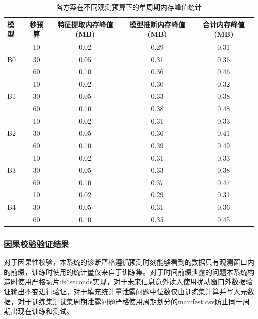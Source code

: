 \documentclass[12pt, a4paper]{ctexart}
\begin{document}
\begin{table}[H]
    \centering
    \caption{各方案在不同观测预算下的单周期内存峰值统计}
    \label{tab:memory_peak}
    \small
    \setlength{\tabcolsep}{4pt}
    \begin{tabular}{lcccc}
        \toprule
        \textbf{模型} & \textbf{秒预算} & \textbf{特征提取内存峰值(MB)} & \textbf{模型推断内存峰值(MB)} & \textbf{合计内存峰值(MB)} \\
        \midrule
        \multirow{3}{*}{B0} & 10 & 0.02 & 0.29 & 0.31 \\
                            & 30 & 0.05 & 0.31 & 0.36 \\
                            & 60 & 0.10 & 0.36 & 0.46 \\
        \midrule
        \multirow{3}{*}{B1} & 10 & 0.02 & 0.30 & 0.32 \\
                            & 30 & 0.05 & 0.33 & 0.38 \\
                            & 60 & 0.10 & 0.38 & 0.48 \\
        \midrule
        \multirow{3}{*}{B2} & 10 & 0.02 & 0.31 & 0.33 \\
                            & 30 & 0.05 & 0.36 & 0.41 \\
                            & 60 & 0.10 & 0.39 & 0.49 \\
        \midrule
        \multirow{3}{*}{B3} & 10 & 0.02 & 0.31 & 0.33 \\
                            & 30 & 0.05 & 0.33 & 0.38 \\
                            & 60 & 0.10 & 0.37 & 0.47 \\
        \midrule
        \multirow{3}{*}{B4} & 10 & 0.02 & 0.29 & 0.31 \\
                            & 30 & 0.05 & 0.31 & 0.36 \\
                            & 60 & 0.10 & 0.35 & 0.45 \\
        \bottomrule
    \end{tabular}
\end{table}
\subsubsection{因果校验验证结果}
对于因果性校验，本系统的诊断严格遵循预测时刻能够看到的数据只有观测窗口内的前缀，训练时使用的统计量仅来自于训练集。对于时间前缀泄露的问题本系统构造时使用严格切片:fs*seconds实现，对于未来信息意外读入使用扰动窗口外数据验证输出不变进行验证。对于填充统计量泄露问题中位数仅由训练集计算并写入元数据，对于训练集测试集周期泄露问题严格使用周期划分的manifest.csv防止同一周期出现在训练和测试。
\end{document}

